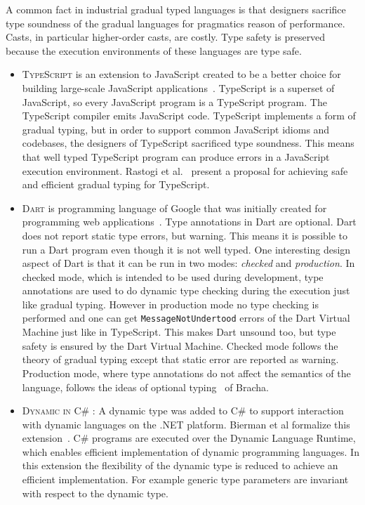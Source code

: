 \documentclass{article}
\begin{document}
A common fact in industrial gradual typed languages is that designers sacrifice type soundness of the gradual languages for pragmatics reason of performance. Casts, in particular higher-order casts, are costly. Type safety is preserved because the execution environments of these languages are type safe.

\begin{itemize}
	\item \textsc{TypeScript} is an extension to JavaScript created to be a better choice for building large-scale JavaScript applications~\cite{biermanAl:ecoop2010}. TypeScript is a superset of JavaScript, so every JavaScript program is a TypeScript program. The TypeScript compiler emits JavaScript code. TypeScript implements a form of gradual typing, but in order to support common JavaScript idioms and codebases, the designers of TypeScript sacrificed type soundness. This means that well typed TypeScript program can produce errors in a JavaScript execution environment. Rastogi et al.~\cite{rastogiAl:sigplan2015} present a proposal for achieving safe and efficient gradual typing for TypeScript.
	\item \textsc{Dart} is programming language of Google that was initially created for programming web applications~\cite{dart-spec}. Type annotations in Dart are optional. Dart does not report static type errors, but warning. This means it is possible to run a Dart program even though it is not well typed. One interesting design aspect of Dart is that it can be run in two modes: \emph{checked} and \emph{production}. In checked mode, which is intended to be used during development, type annotations are used to do dynamic type checking during the execution just like gradual typing. However in production mode no type checking is performed and one can get \texttt{MessageNotUndertood} errors of the Dart Virtual Machine just like in TypeScript. This makes Dart unsound too, but type safety is ensured by the Dart Virtual Machine. Checked mode follows the theory of gradual typing except that static error are reported as warning. Production mode, where type annotations do not affect the semantics of the language, follows the ideas of optional typing~\cite{bracha:rdl2004} of Bracha.
	\item \textsc{Dynamic in C\# :} A dynamic type was added to C\# to support interaction with dynamic languages on the .NET platform. Bierman et al formalize this extension~\cite{biermanAl:ecoop2010}. C\# programs are executed over the Dynamic Language Runtime, which enables efficient implementation of dynamic programming languages. In this extension the flexibility of the dynamic type is reduced to achieve an efficient implementation. For example generic type parameters are invariant with respect to the dynamic type.

\end{itemize}
\end{document}
